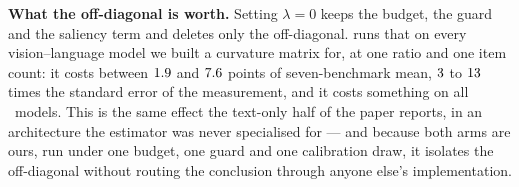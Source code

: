 \begin{table}[t]
\centering\small
\caption{The ratio axis on Qwen2.5-VL-7B and Qwen3-VL-8B, $1000$ items per benchmark.
Same seven benchmarks, same arms, same guard as \cref{tab:vlm}.}
\label{tab:vlm-sweep}

\end{table}

\textbf{What the off-diagonal is worth.} Setting $\lambda{=}0$ keeps the budget, the guard and the
saliency term and deletes only the off-diagonal.  runs that on every
vision--language model we built a curvature matrix for, at one ratio and one item count: it costs
between $1.9$ and $7.6$ points of seven-benchmark mean, $3$ to
$13$ times the standard error of the measurement, and it costs something on all
\vlmAblNW\ models. This is the same effect the text-only half of the paper reports, in an architecture
the estimator was never specialised for --- and because both arms are ours, run under one budget, one
guard and one calibration draw, it isolates the off-diagonal without routing the conclusion through
anyone else's implementation.

\begin{table}[t]
\centering\small
\caption{What the off-diagonal buys, per model, at $\rho{=}30\%$ and $1000$ items per benchmark.
$\lambda{=}0$ keeps the budget, the guard and the diagonal saliency term and removes only the
coupling; $\Delta$ is what that costs.}
\label{tab:vlm-ablation}

\end{table}

